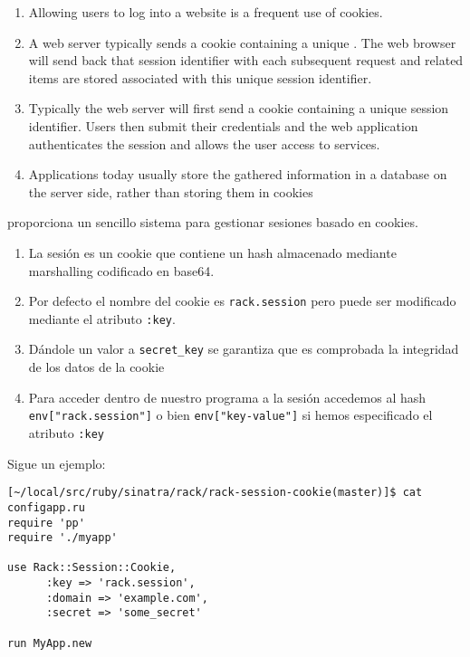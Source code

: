   \begin{enumerate}
  \item 
    Allowing users to log into a website is a frequent use of
    cookies. 
  \item 
   A web server typically sends a cookie containing a unique 
    . The web browser will send back that session identifier
   with each subsequent request and related items are stored
   associated with this unique session identifier.
    \item 
    Typically the web server will first send a cookie
    containing a unique session identifier. Users then submit their
    credentials and the web application authenticates the session
    and allows the user access to services.
    \item 
    Applications today usually store the gathered information
    in a database on the server side, rather than storing them 
    in cookies
  \end{enumerate}


\racksessioncookie{} proporciona un sencillo sistema para gestionar
sesiones basado en cookies.

\begin{enumerate}
\item 
La sesión es un cookie que contiene un
hash almacenado mediante marshalling codificado en base64.
\item 
Por defecto el nombre del cookie es \verb|rack.session| pero puede ser 
modificado mediante el atributo \verb|:key|.
\item 
Dándole un valor a \verb|secret_key| se garantiza que es comprobada 
la integridad de los datos de la cookie
\item 
Para acceder dentro de nuestro programa
a la sesión accedemos al hash \verb|env["rack.session"]| o bien
\verb|env["key-value"]| si hemos especificado el atributo
\verb|:key|
\end{enumerate}

Sigue un ejemplo:
\begin{verbatim}
[~/local/src/ruby/sinatra/rack/rack-session-cookie(master)]$ cat configapp.ru 
require 'pp'
require './myapp'

use Rack::Session::Cookie, 
      :key => 'rack.session', 
      :domain => 'example.com',
      :secret => 'some_secret'

run MyApp.new
\end{verbatim}

